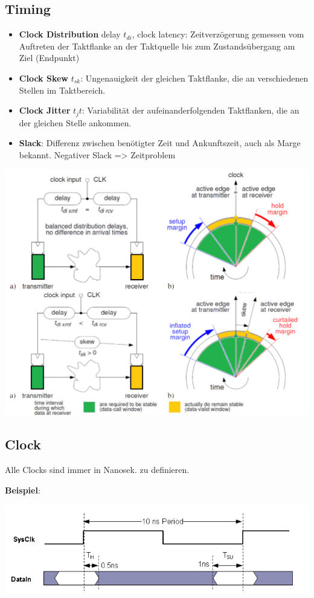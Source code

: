 \subsection{Timing}
\begin{itemize}[nosep]
\item \textbf{Clock Distribution} delay $t_{di}$, clock latency: Zeitverzögerung gemessen vom Auftreten der Taktflanke an der Taktquelle bis zum Zustandsübergang am Ziel (Endpunkt)
\item \textbf{Clock Skew} $t_{sk}$: Ungenauigkeit der gleichen Taktflanke, die an verschiedenen Stellen im Taktbereich.
\item \textbf{Clock Jitter} $t_jt$: Variabilität der aufeinanderfolgenden Taktflanken, die an der gleichen Stelle ankommen.
\item \textbf{Slack}: Differenz zwischen benötigter Zeit und Ankunftszeit, auch als Marge bekannt. Negativer Slack => Zeitproblem
\end{itemize}
\begin{center}
	\includegraphics[width=\columnwidth]{Images/slack}
\end{center}

\subsection{Clock}
Alle Clocks sind immer in Nanosek. zu definieren.

\textbf{Beispiel}:
\begin{center}
	\includegraphics[width=\columnwidth]{Images/clock}
\end{center}

